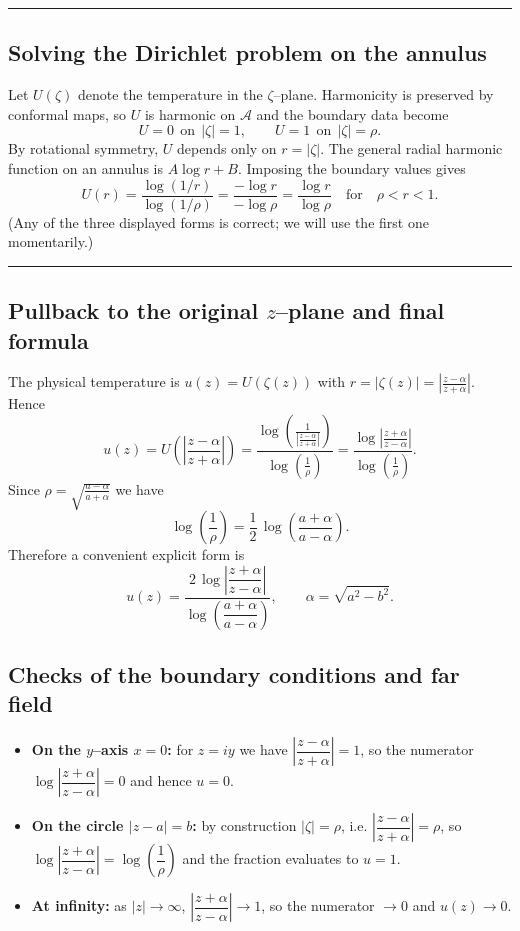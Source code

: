 \documentclass[11pt]{article}
\begin{document}
	\bigskip\hrule\bigskip
	
	\subsection*{Solving the Dirichlet problem on the annulus}
	Let $U(\zeta)$ denote the temperature in the $\zeta$–plane. Harmonicity is preserved by conformal maps, so
	$U$ is harmonic on $\mathcal A$ and the boundary data become
	\[
	U=0 \ \ \text{on}\ \ |\zeta|=1,
	\qquad
	U=1 \ \ \text{on}\ \ |\zeta|=\rho.
	\]
	By rotational symmetry, $U$ depends only on $r=|\zeta|$. The general radial harmonic function on an annulus is
	$A\log r + B$. Imposing the boundary values gives
	\[
	U(r)=\frac{\log(1/r)}{\log(1/\rho)}
	=\frac{-\log r}{-\log \rho}
	=\frac{\log r}{\log \rho}
	\quad\text{for}\quad \rho<r<1.
	\]
	(Any of the three displayed forms is correct; we will use the first one momentarily.)
	
	\bigskip\hrule\bigskip
	
	\subsection*{Pullback to the original $z$–plane and final formula}
	The physical temperature is $u(z)=U(\zeta(z))$ with $r=|\zeta(z)|=\left|\frac{z-\alpha}{z+\alpha}\right|$.
	Hence
	\[
	u(z)
	=U\!\left(\left|\frac{z-\alpha}{z+\alpha}\right|\right)
	=\frac{\displaystyle \log\!\left(\frac{1}{\left|\frac{z-\alpha}{z+\alpha}\right|}\right)}
	{\displaystyle \log\!\left(\frac{1}{\rho}\right)}
	=\frac{\displaystyle \log\left|\frac{z+\alpha}{z-\alpha}\right|}
	{\displaystyle \log\!\left(\frac{1}{\rho}\right)}.
	\]
	Since $\displaystyle \rho=\sqrt{\frac{a-\alpha}{a+\alpha}}$ we have
	\[
	\log\!\left(\frac{1}{\rho}\right)
	=\frac{1}{2}\,\log\!\left(\frac{a+\alpha}{a-\alpha}\right).
	\]
	Therefore a convenient explicit form is
	\[
	\boxed{\quad
		u(z)
		=\frac{2\,\log\!\left|\dfrac{z+\alpha}{z-\alpha}\right|}
		{\log\!\left(\dfrac{a+\alpha}{a-\alpha}\right)},
		\qquad
		\alpha=\sqrt{a^{2}-b^{2}}.
		\quad}
	\]
	
	\bigskip
	
	\subsection*{Checks of the boundary conditions and far field}
	\begin{itemize}
		\item \textbf{On the $y$--axis $x=0$:} for $z=iy$ we have $\left|\dfrac{z-\alpha}{z+\alpha}\right|=1$,
		so the numerator $\log\left|\dfrac{z+\alpha}{z-\alpha}\right|=0$ and hence $u=0$.
		\item \textbf{On the circle $|z-a|=b$:} by construction $|\zeta|=\rho$, i.e.
		$\left|\dfrac{z-\alpha}{z+\alpha}\right|=\rho$, so
		$\log\left|\dfrac{z+\alpha}{z-\alpha}\right|=\log\!\left(\dfrac{1}{\rho}\right)$
		and the fraction evaluates to $u=1$.
		\item \textbf{At infinity:} as $|z|\to\infty$, $\left|\dfrac{z+\alpha}{z-\alpha}\right|\to 1$,
		so the numerator $\to 0$ and $u(z)\to 0$.
	\end{itemize}
	
\end{document}
